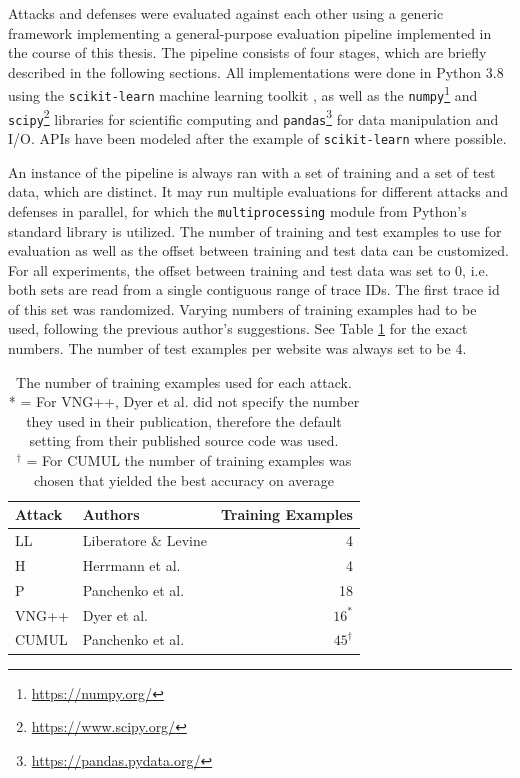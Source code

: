 \documentclass[
	ruledheaders=chapter,
	class=report,
	thesis={type=master, department=inf},
	accentcolor=1c,
	custommargins=true,
	marginpar=false,
	parskip=half-,
	fontsize=11pt,
]{tudapub}
\begin{document}
	Attacks and defenses were evaluated against each other using a generic framework implementing a general-purpose evaluation pipeline implemented in the course of this thesis. The pipeline consists of four stages, which are briefly described in the following sections. All implementations were done in Python 3.8 using the \texttt{scikit-learn} machine learning toolkit \cite{Pedregosa2011}, as well as the \texttt{numpy}\footnote{\url{https://numpy.org/}} \cite{Harris2020} and \texttt{scipy}\footnote{\url{https://www.scipy.org/}} \cite{Virtanen2020} libraries for scientific computing and \texttt{pandas}\footnote{\url{https://pandas.pydata.org/}} \cite{McKinney2010,Reback2021} for data manipulation and I/O. APIs have been modeled after the example of \texttt{scikit-learn} \cite{Buitinck2013} where possible.
	
	An instance of the pipeline is always ran with a set of training and a set of test data, which are distinct. It may run multiple evaluations for different attacks and defenses in parallel, for which the \texttt{multiprocessing} module from Python's standard library is utilized. The number of training and test examples to use for evaluation as well as the offset between training and test data can be customized. For all experiments, the offset between training and test data was set to 0, i.e. both sets are read from a single contiguous range of trace IDs. The first trace id of this set was randomized. Varying numbers of training examples had to be used, following the previous author's suggestions. See Table \ref{tbl:train} for the exact numbers. The number of test examples per website was always set to be 4.
	
	\begin{table}
		\centering
		\begin{tabularx}{0.85\textwidth}{lXr}
			\toprule \textbf{Attack} & \textbf{Authors} & \textbf{Training Examples} \\
			\midrule LL & Liberatore \& Levine \cite{Liberatore2006} & 4 \\
			H & Herrmann et al. \cite{Herrmann2009} & 4 \\
			P & Panchenko et al. \cite{Panchenko2011} & 18\\
			VNG++ & Dyer et al. \cite{Dyer2012} & $16^*$\\
			CUMUL & Panchenko et al. \cite{Panchenko2016} & $45^\dagger$\\
			\bottomrule
		\end{tabularx}
		\caption[The number of training examples used for each attack]{The number of training examples used for each attack.\\{*} = For VNG++, Dyer et al. did not specify the number they used in their publication, therefore the default setting from their published source code was used.\\{${}^\dagger$} = For CUMUL the number of training examples was chosen that yielded the best accuracy on average}
		\label{tbl:train}
	\end{table}
	
\end{document}

